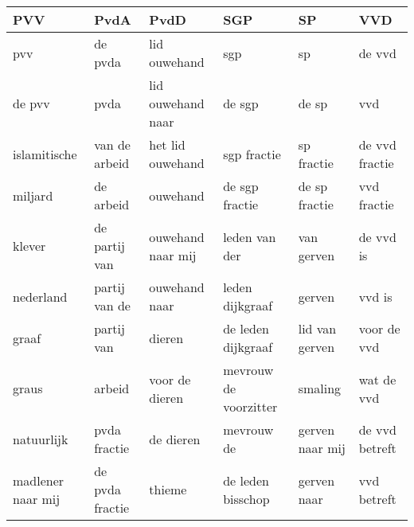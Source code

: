 \begin{tabular}{llllll}
\toprule
               PVV &             PvdA &               PvdD &                    SGP &               SP &             VVD \\
\midrule
               pvv &          de pvda &       lid ouwehand &                    sgp &               sp &          de vvd \\
            de pvv &             pvda &  lid ouwehand naar &                 de sgp &            de sp &             vvd \\
      islamitische &    van de arbeid &   het lid ouwehand &            sgp fractie &       sp fractie &  de vvd fractie \\
           miljard &        de arbeid &           ouwehand &         de sgp fractie &    de sp fractie &     vvd fractie \\
            klever &    de partij van &  ouwehand naar mij &          leden van der &       van gerven &       de vvd is \\
         nederland &    partij van de &      ouwehand naar &        leden dijkgraaf &           gerven &          vvd is \\
             graaf &       partij van &             dieren &     de leden dijkgraaf &   lid van gerven &     voor de vvd \\
             graus &           arbeid &     voor de dieren &  mevrouw de voorzitter &          smaling &      wat de vvd \\
        natuurlijk &     pvda fractie &          de dieren &             mevrouw de &  gerven naar mij &  de vvd betreft \\
 madlener naar mij &  de pvda fractie &             thieme &      de leden bisschop &      gerven naar &     vvd betreft \\
\bottomrule
\end{tabular}
